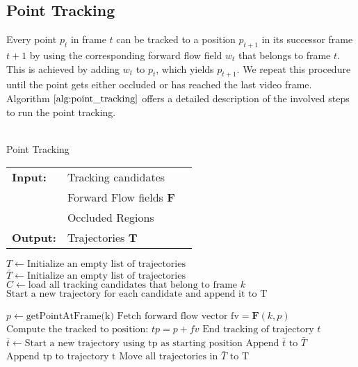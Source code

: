 \subsection{Point Tracking}
Every point $p_t$ in frame $t$ can be tracked to a position $p_{t+1}$ in its successor frame $t+1$ by using the corresponding forward flow field $w_t$ that belongs to frame $t$. This is achieved by adding $w_t$ to $p_t$, which yields $p_{t+1}$. We repeat this procedure until the point gets either occluded or has reached the last video frame. Algorithm $\ref{alg:point_tracking}$ offers a detailed description of the involved steps to run the point tracking. \\ \\
\begin{algorithm}[H]
\caption{Point Tracking}
\begin{table}[H]
  \begin{tabular}{@{}lll@{}}
    \textbf{Input:} & Tracking candidates \\
    	& Forward Flow fields $\textbf{F}$ \\
        & Occluded Regions \\
	\textbf{Output:} & Trajectories $\textbf{T}$
  \end{tabular} 
\end{table}
\setlength{\fboxrule}{0pt} 
\begin{boxedminipage}{1.0\textwidth}
  \begin{algorithmic}[1]
  	\State $T \leftarrow \text{Initialize an empty list of trajectories}$
  	\State $\bar{T} \leftarrow \text{Initialize an empty list of trajectories}$
  		\State $C \leftarrow \text{load all tracking candidates that belong to frame } k$
  		\State $\text{Start a new trajectory for each candidate and append it to T}$

  			\State $p \leftarrow \text{getPointAtFrame(k)}$
  		  	\State $\text{Fetch forward flow vector fv} = \textbf{F} \left(k, p \right)$
  			\State $\text{Compute the tracked to position: } tp = p + fv$
  				\State $\text{End tracking of trajectory } t $
  				\State $\bar{t} \leftarrow \text{Start a new trajectory using tp as starting position}$
  				\State $\text{Append } \bar{t} \text{ to } \bar{T}$
  			\Else 
  				\State $\text{Append tp to trajectory t}$
  			\EndIf
  		\EndFor
  		\State $\text{Move all trajectories in } \bar{T} \text{ to T}$
    \EndFor
  \end{algorithmic}
  \end{boxedminipage}
  \vskip1.5pt
\label{alg:point_tracking}
\end{algorithm}
